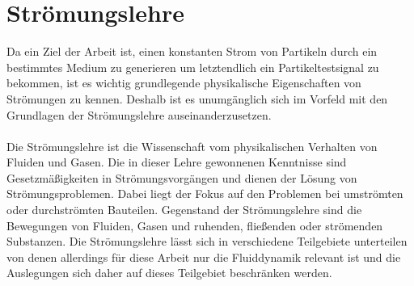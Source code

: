 \section{Str\"{o}mungslehre}
Da ein Ziel der Arbeit ist, einen konstanten Strom von Partikeln durch ein bestimmtes Medium zu generieren um letztendlich ein Partikeltestsignal zu bekommen, ist es wichtig grundlegende physikalische Eigenschaften von Str\"{o}mungen zu kennen. Deshalb ist es unumg\"{a}nglich sich im Vorfeld mit den Grundlagen der Str\"{o}mungslehre auseinanderzusetzen.
\\\\
Die Str\"{o}mungslehre ist die Wissenschaft vom physikalischen Verhalten von Fluiden und Gasen. Die in dieser Lehre gewonnenen Kenntnisse sind Gesetzm\"{a}{\ss}igkeiten in Str\"{o}mungsvorg\"{a}ngen und dienen der L\"{o}sung von Str\"{o}mungsproblemen. Dabei liegt der Fokus auf den Problemen bei umstr\"{o}mten oder durchstr\"{o}mten Bauteilen. Gegenstand der Str\"{o}mungslehre sind die Bewegungen von Fluiden, Gasen und ruhenden, flie{\ss}enden oder str\"{o}menden Substanzen. Die Str\"{o}mungslehre l\"{a}sst sich in verschiedene Teilgebiete unterteilen von denen allerdings f\"{u}r diese Arbeit nur die Fluiddynamik relevant ist und die Auslegungen sich daher auf dieses Teilgebiet beschr\"{a}nken werden\cite{stream}.

